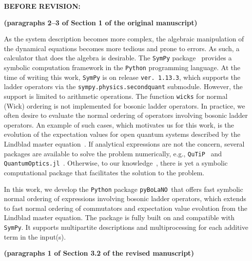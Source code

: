 \documentclass[12pt, a4paper]{article}
\newcommand{\inlinecode}[1]{\texttt{#1}}
\newcommand{\pybolano}{\texttt{pyBoLaNO}~}
\newenvironment{revpre}{%
\textbf{{BEFORE REVISION:}}
\par
}
{\bigskip}
\begin{document}
\newpage

\begin{revpre}

\textbf{(paragraphs 2--3 of Section 1 of the original manuscript)}

As the system description becomes more complex, the algebraic manipulation of the dynamical equations becomes more tedious and prone to errors. As such, a calculator that does the algebra is desirable. The \texttt{SymPy} package~\cite{meurer_sympy_2017} provides a symbolic computation framework in the \texttt{Python} programming language. At the time of writing this work, \texttt{SymPy} is on release \inlinecode{ver. 1.13.3}, which supports the ladder operators via the \inlinecode{sympy.physics.secondquant} submodule. However, the support is limited to arithmetic operations. The function \inlinecode{wicks} for normal (Wick) ordering is not implemented for bosonic ladder operators. In practice, we often desire to evaluate the normal ordering of operators involving bosonic ladder operators. An example of such cases, which motivates us for this work, is the evolution of the expectation values for open quantum systems described by the Lindblad master equation~\cite{schlosshauer_decoherence_2007, breuer_theory_2002}. If analytical expressions are not the concern, several packages are available to solve the problem numerically, e.g., \texttt{QuTiP}~\cite{johansson_qutip_2012, johansson_qutip_2013} and \texttt{QuantumOptics.jl}~\cite{Kramer2018}. Otherwise, to our knowledge~\cite{chia_relaxation_2020, Shen2023, downing_hyperbolic_2024, Krimer2019, Zens2019, Ahmadi2024, Downing2021, Downing2022, Downing2023, BenArosh2021, Amitai2018.PhysRevE.97.052203, Minganti2019, Chimczak2023, Farina2019, Zhang2021}, there is yet a symbolic computational package that facilitates the solution to the problem.

In this work, we develop the \texttt{Python} package \pybolano that offers fast symbolic normal ordering of expressions involving bosonic ladder operators, which extends to fast normal ordering of commutators and expectation value evolution from the Lindblad master equation.  The package is fully built on and compatible with \texttt{SymPy}. It supports multipartite descriptions and multiprocessing for each additive term in the input(s). 

\textbf{(paragraphs 1 of Section 3.2 of the revised manuscript)}


\end{revpre}
\end{document}
